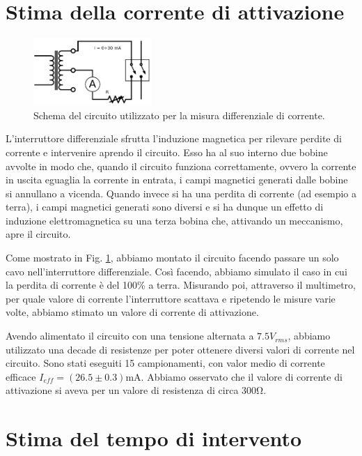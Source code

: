 \section{Stima della corrente di attivazione}

\begin{figure}
	\centering
    \includegraphics[width=0.40\textwidth]{amper.pdf}
    \caption{Schema del circuito utilizzato per la misura differenziale di corrente.}
    \label{fig:amper}
\end{figure}

L'interruttore differenziale sfrutta l'induzione magnetica per rilevare perdite di corrente e intervenire aprendo il circuito. Esso ha al suo interno due bobine avvolte in modo che, quando il circuito funziona correttamente, ovvero la corrente in uscita eguaglia la corrente in entrata, i campi magnetici generati dalle bobine si annullano a vicenda. Quando invece si ha una perdita di corrente (ad esempio a terra), i campi magnetici generati sono diversi e si ha dunque un effetto di induzione elettromagnetica su una terza bobina che, attivando un meccanismo, apre il circuito.

Come mostrato in Fig. \ref{fig:amper}, abbiamo montato il circuito facendo passare un solo cavo nell'interruttore differenziale. Così facendo, abbiamo simulato il caso in cui la perdita di corrente è del 100\% a terra. Misurando poi, attraverso il multimetro, per quale valore di corrente l'interruttore scattava e ripetendo le misure varie volte, abbiamo stimato un valore di corrente di attivazione. 

Avendo alimentato il circuito con una tensione alternata a $7.5V_{rms}$, abbiamo utilizzato una decade di resistenze per poter ottenere diversi valori di corrente nel circuito. Sono stati eseguiti 15 campionamenti, con valor medio di corrente efficace $I_{eff} =  (26.5\pm0.3)\si{\milli\ampere}$. Abbiamo osservato che il valore di corrente di attivazione si aveva per un valore di resistenza di circa $300\si{\ohm}$. 


\section{Stima del tempo di intervento}


